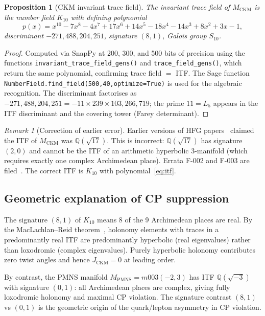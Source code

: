\documentclass[11pt,a4paper]{article}
\newtheorem{proposition}[theorem]{Proposition}
\theoremstyle{remark}
\newtheorem{remark}[theorem]{Remark}
\newcommand{\MCKM}{M_{\mathrm{CKM}}}
\newcommand{\MPMNS}{M_{\mathrm{PMNS}}}
\newcommand{\QQ}{\mathbb{Q}}
\newcommand{\Kten}{K_{10}}
\begin{document}
\begin{proposition}[CKM invariant trace field]
\label{prop:itf}
The invariant trace field of $\MCKM$ is the number field $\Kten$ with
defining polynomial
\begin{equation}
p(x) = x^{10} - 7x^8 - 4x^7 + 17x^6 + 14x^5
       - 18x^4 - 14x^3 + 8x^2 + 3x - 1,
\label{eq:itf}
\end{equation}
discriminant $-271{,}488{,}204{,}251$, signature $(8,1)$, Galois group $S_{10}$.
\end{proposition}

\begin{proof}\sloppy
Computed via SnapPy at 200, 300, and 500 bits of precision using the
functions \texttt{invariant\_trace\_\allowbreak field\_gens()} and
\texttt{trace\_field\_gens()}, which return the same polynomial,
confirming trace field $=$ ITF.
The Sage function \texttt{NumberField.\allowbreak find\_\allowbreak field(500,40,\allowbreak optimize=True)}
is used for the algebraic recognition.
The discriminant factorises as
$-271{,}488{,}204{,}251 = -11 \times 239 \times 103{,}266{,}719$;
the prime $11 = L_5$ appears in the ITF discriminant
and the covering tower (Farey determinant).
\fussy\end{proof}

\begin{remark}[Correction of earlier error]
Earlier versions of HFG papers~\cite{Gentry:Unified} claimed the ITF
of $\MCKM$ was $\QQ(\sqrt{17})$.
This is incorrect: $\QQ(\sqrt{17})$ has signature $(2,0)$ and cannot
be the ITF of an arithmetic hyperbolic 3-manifold (which requires
exactly one complex Archimedean place).
Errata F-002 and F-003 are filed~\cite{Gentry:Unified}.
The correct ITF is $\Kten$ with polynomial~\eqref{eq:itf}.
\end{remark}

\subsection{Geometric explanation of CP suppression}

The signature $(8,1)$ of $\Kten$ means 8 of the 9 Archimedean places
are real.
By the MacLachlan--Reid theorem~\cite{MaclachlanReid}, holonomy
elements with traces in a predominantly real ITF are predominantly
hyperbolic (real eigenvalues) rather than loxodromic (complex
eigenvalues).
Purely hyperbolic holonomy contributes zero twist angles and hence
$J_\mathrm{CKM} = 0$ at leading order.

By contrast, the PMNS manifold $\MPMNS = m003(-2,3)$ has ITF
$\QQ(\sqrt{-3})$ with signature $(0,1)$: all Archimedean places are
complex, giving fully loxodromic holonomy and maximal CP violation.
The signature contrast $(8,1)$ vs $(0,1)$ is the geometric origin of
the quark/lepton asymmetry in CP violation.
\end{document}
